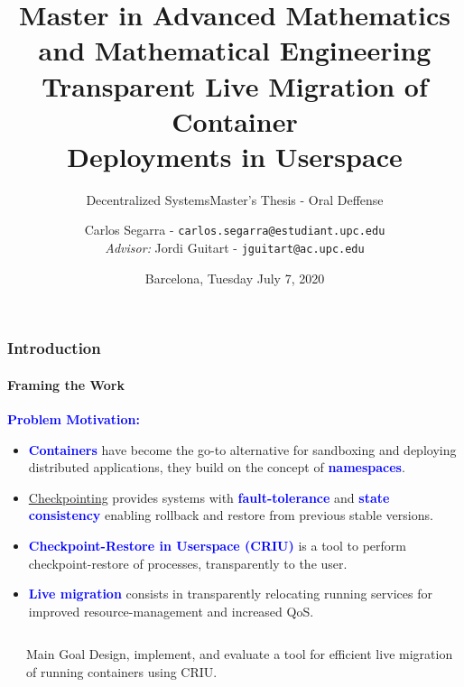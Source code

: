 \documentclass[9pt,    %
    english,            %
    xcolor=table,       %
    envcountsect,        %
    aspectratio=169     %
]{beamer}
\subtitle{Decentralized Systems} %
\title[C/R of Established TCP Connections] %
    {\normalsize Master in Advanced Mathematics and Mathematical Engineering \\[5pt] \Large Transparent Live Migration of Container \\ \Large Deployments in Userspace}
\subtitle{Master's Thesis - Oral Deffense} %
\date[July 7, 2020] %
    {Barcelona, Tuesday July 7, 2020}
\author[] %
{Carlos Segarra - \texttt{carlos.segarra@estudiant.upc.edu} \\ \textit{Advisor:} Jordi Guitart - \texttt{jguitart@ac.upc.edu}}
\begin{document}

\begin{frame}
  \titlepage
\end{frame}

\begin{frame}
    \frametitle{Introduction}
    \framesubtitle{Framing the Work}

    \textbf{\textcolor{blue}{Problem Motivation:}}
    \begin{itemize}
        \item \textbf{\textcolor{blue}{Containers}} have become the go-to alternative for sandboxing and deploying distributed applications, they build on the concept of \textbf{\textcolor{blue}{namespaces}}.
        \item \href{https://en.wikipedia.org/wiki/Application_checkpointing}{Checkpointing} provides systems with \textbf{\textcolor{blue}{fault-tolerance}} and \textbf{\textcolor{blue}{state consistency}} enabling rollback and restore from previous stable versions.
        \item \textbf{\textcolor{blue}{Checkpoint-Restore in Userspace (CRIU)}} is a tool to perform checkpoint-restore of processes, transparently to the user.
        \item \textbf{\textcolor{blue}{Live migration}} consists in transparently relocating running services for improved resource-management and increased QoS.
    \end{itemize}

    \begin{columns}
        \begin{column}{.1\textwidth}
        \end{column}\hspace{-5cm}
        \begin{column}{.7\textwidth}
            \begin{alertblock}{Main Goal}
                Design, implement, and evaluate a tool for efficient live migration of running containers using CRIU.
            \end{alertblock}\hfill
        \end{column}
    \end{columns}

\end{frame}
\end{document}
